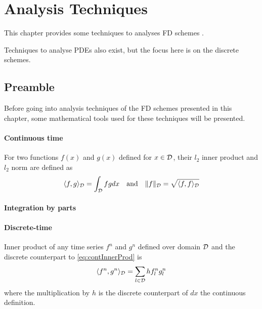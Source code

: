 \chapter{Analysis Techniques}\label{ch:analysis}

This chapter provides some techniques to analyses FD schemes .

Techniques to analyse PDEs also exist, but the focus here is on the discrete schemes.

\section{Preamble}


Before going into analysis techniques of the FD schemes presented in this chapter, some mathematical tools used for these techniques will be presented. 

\subsubsection{Continuous time}
For two functions $f(x)$ and $g(x)$ defined for $x\in\mathcal{D}$, their $l_2$ inner product and $l_2$ norm are defined as
\begin{equation}\label{eq:contInnerProd}
    \langle f, g\rangle_{\mathcal{D}} = \int_{\mathcal{D}} fg dx \quad \text{and} \quad \lVert f \rVert_{\mathcal{D}} = \sqrt{\langle f, f \rangle_{\mathcal{D}}}
\end{equation}

\subsubsection{Integration by parts}


\subsubsection{Discrete-time}
Inner product of any time series $f^n$ and $g^n$ defined over domain $\mathcal{D}$ and the discrete counterpart to \eqref{eq:contInnerProd} is
\begin{equation}\label{eq:discInnerProd}
    \langle f^n, g^n \rangle_{\mathcal{D}} = \sum_{l\in\mathcal{D}} h f_l^n g_l^n
\end{equation}
where the multiplication by $h$ is the discrete counterpart of $dx$ the continuous definition. 

